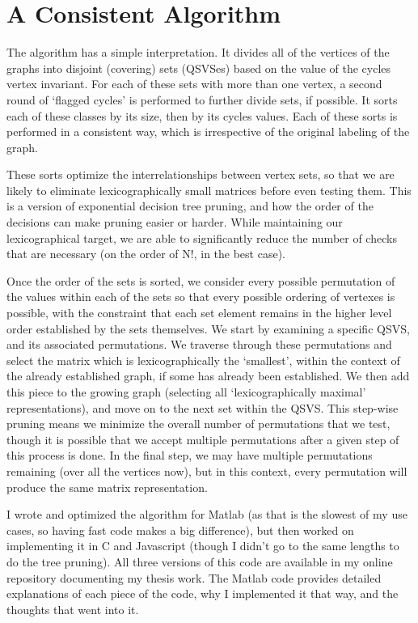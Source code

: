 \section{A Consistent Algorithm}
The algorithm has a simple interpretation. 
It divides all of the vertices of the graphs into disjoint (covering) sets (QSVSes) based on the value of the cycles vertex invariant.
For each of these sets with more than one vertex, a second round of `flagged cycles' is performed to further divide sets, if possible.
It sorts each of these classes by its size, then by its cycles values.
Each of these sorts is performed in a consistent way, which is irrespective of the original labeling of the graph.

These sorts optimize the interrelationships between vertex sets, so that we are likely to eliminate lexicographically small matrices before even testing them.
This is a version of exponential decision tree pruning, and how the order of the decisions can make pruning easier or harder.
While maintaining our lexicographical target, we are able to significantly reduce the number of checks that are necessary (on the order of N!, in the best case).

Once the order of the sets is sorted, we consider every possible permutation of the values within each of the sets so that every possible ordering of vertexes is possible, with the constraint that each set element remains in the higher level order established by the sets themselves.
We start by examining a specific QSVS, and its associated permutations.
We traverse through these permutations and select the matrix which is lexicographically the `smallest', within the context of the already established graph, if some has already been established.
We then add this piece to the growing graph (selecting all `lexicographically maximal' representations), and move on to the next set within the QSVS.
This step-wise pruning means we minimize the overall number of permutations that we test, though it is possible that we accept multiple permutations after a given step of this process is done.
In the final step, we may have multiple permutations remaining (over all the vertices now), but in this context, every permutation will produce the same matrix representation.

I wrote and optimized the algorithm for Matlab (as that is the slowest of my use cases, so having fast code makes a big difference), but then worked on implementing it in C and Javascript (though I didn't go to the same lengths to do the tree pruning).
All three versions of this code are available in my online repository documenting my thesis work.
The Matlab code provides detailed explanations of each piece of the code, why I implemented it that way, and the thoughts that went into it.


